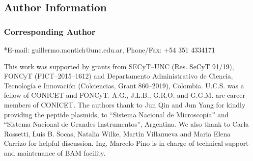 \documentclass[journal=jacsat,manuscript=article]{achemso}
\begin{document}
\subsection*{Author Information}\label{sec:authors}
\subsubsection{Corresponding Author}
*E-mail: guillermo.montich@unc.edu.ar, Phone/Fax: +54 351 4334171

\begin{acknowledgement}
This work was supported by grants from SECyT–UNC (Res. SeCyT 91/19), FONCyT (PICT–2015–1612) and Departamento Administrativo de Ciencia, Tecnología e Innovación (Colciencias, Grant 860–2019), Colombia. U.C.S. was a fellow of CONICET and FONCyT. A.G., J.L.B., G.R.O. and G.G.M. are career members of CONICET. The authors thank to Jun Qin and Jun Yang for kindly providing the peptide plasmids, to “Sistema Nacional de Microscopía” and “Sistema Nacional de Grandes Instrumentos”, Argentina. We also thank to Carla Rossetti, Luis B. Socas, Natalia Wilke, Martín Villanueva and Maria Elena Carrizo for helpful discussion. Ing. Marcelo Pino is in charge of technical support and maintenance of BAM facility.
\end{acknowledgement}


\end{document}
